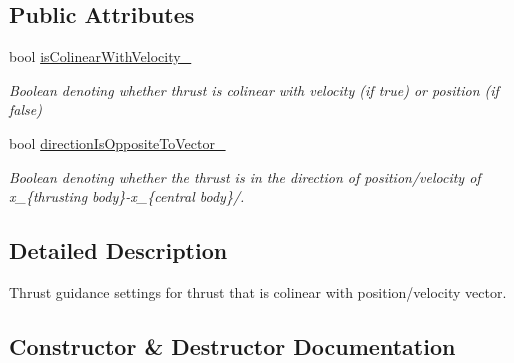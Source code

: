 \subsection*{Public Attributes}
\begin{DoxyCompactItemize}
\item 
bool \hyperlink{classtudat_1_1simulation__setup_1_1ThrustDirectionFromStateGuidanceSettings_aac0340ce4fb0bad38cb9bfa73a923ad9}{is\+Colinear\+With\+Velocity\+\_\+}\hypertarget{classtudat_1_1simulation__setup_1_1ThrustDirectionFromStateGuidanceSettings_aac0340ce4fb0bad38cb9bfa73a923ad9}{}\label{classtudat_1_1simulation__setup_1_1ThrustDirectionFromStateGuidanceSettings_aac0340ce4fb0bad38cb9bfa73a923ad9}

\begin{DoxyCompactList}\small\item\em Boolean denoting whether thrust is colinear with velocity (if true) or position (if false) \end{DoxyCompactList}\item 
bool \hyperlink{classtudat_1_1simulation__setup_1_1ThrustDirectionFromStateGuidanceSettings_ac81da37321b679aeb9347a7f6b9f3d17}{direction\+Is\+Opposite\+To\+Vector\+\_\+}\hypertarget{classtudat_1_1simulation__setup_1_1ThrustDirectionFromStateGuidanceSettings_ac81da37321b679aeb9347a7f6b9f3d17}{}\label{classtudat_1_1simulation__setup_1_1ThrustDirectionFromStateGuidanceSettings_ac81da37321b679aeb9347a7f6b9f3d17}

\begin{DoxyCompactList}\small\item\em Boolean denoting whether the thrust is in the direction of position/velocity of x\+\_\+\{thrusting body\}-\/x\+\_\+\{central body\}/. \end{DoxyCompactList}\end{DoxyCompactItemize}


\subsection{Detailed Description}
Thrust guidance settings for thrust that is colinear with position/velocity vector. 

\subsection{Constructor \& Destructor Documentation}
